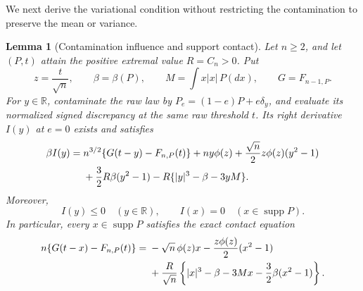 \documentclass[aop]{imsart}
\theoremstyle{plain}
\newtheorem{lemma}[theorem]{Lemma}
\theoremstyle{definition}
\theoremstyle{definition}
\newcommand{\R}{\mathbb R}
\DeclareMathOperator{\supp}{supp}
\begin{document}
We next derive the variational condition without restricting the
contamination to preserve the mean or variance.

\begin{lemma}[Contamination influence and support contact]
\label{lem:influence}
Let \(n\ge2\), and let \((P,t)\) attain the positive extremal value
\(R=C_n>0\). Put
\[
z=\frac{t}{\sqrt n},\qquad
\beta=\beta(P),\qquad M=\int x|x|\,P(dx),\qquad G=F_{n-1,P}.
\]
For \(y\in\R\), contaminate the raw law by
\(P_e=(1-e)P+e\delta_y\), and evaluate its normalized signed discrepancy
at the same raw threshold \(t\). Its right derivative \(I(y)\) at
\(e=0\) exists and satisfies
\begin{align}
\beta I(y)={}&n^{3/2}\{G(t-y)-F_{n,P}(t)\}
+ny\phi(z)+\frac{\sqrt n}{2}z\phi(z)(y^2-1)\notag\\
&+\frac32R\beta(y^2-1)
-R\{|y|^3-\beta-3yM\}.\label{eq:influence}
\end{align}
Moreover,
\begin{equation}
\label{eq:contact}
I(y)\le0\quad(y\in\R),
\qquad I(x)=0\quad(x\in\supp P).
\end{equation}
In particular, every \(x\in\supp P\) satisfies the exact contact equation
\begin{align}
n\{G(t-x)-F_{n,P}(t)\}={}&-\sqrt n\,\phi(z)x
-\frac{z\phi(z)}2(x^2-1)\notag\\
&+\frac{R}{\sqrt n}
\left\{|x|^3-\beta-3Mx-\frac32\beta(x^2-1)\right\}.
\label{eq:contact-equation}
\end{align}
\end{lemma}
\end{document}
